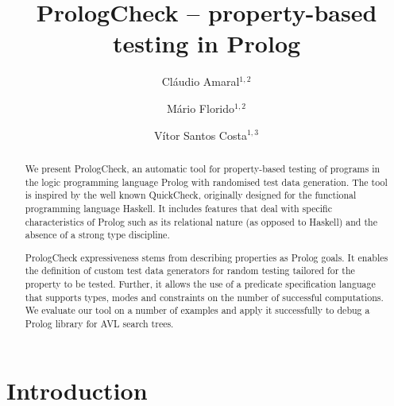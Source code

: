 \documentclass[runningheads,a4paper]{llncs}
\newcommand{\Prolog}[0]{{\sf Prolog}}
\newcommand{\Haskell}[0]{{\sf Haskell}}
\newcommand{\QuickCheck}[0]{{\sf QuickCheck}}
\newcommand{\plqc}[0]{{\sf PrologCheck}}
\begin{document}
\newcommand{\papertitle}{{PrologCheck} -- property-based testing in {Prolog}}

\mainmatter  %

\title{\papertitle}


\author{
  Cl\'audio Amaral$^{1,2}$ \and
  M\'ario Florido$^{1,2}$ \and
  V\'itor Santos Costa$^{1,3}$
}



\maketitle
\begin{abstract}


We present \plqc{}, an automatic tool for property-based
testing of programs in the logic programming language \Prolog{} with
randomised test data generation.
%
The tool is inspired by the well known \QuickCheck, originally designed
for the functional programming language \Haskell{}. It includes features
that deal with specific characteristics of \Prolog{} such as its
relational nature (as opposed to \Haskell{}) and the absence of a strong
type discipline.


\plqc{} expressiveness stems from describing properties as
\Prolog{} goals.
%
It enables the definition of custom test data generators for
random testing tailored for the property to be tested.
%
Further, it allows the use of a predicate specification language that
supports types, modes and constraints on the number of successful
computations.
%
We evaluate our tool on a number of  examples and apply
it successfully to debug a \Prolog{} library for AVL search trees.

\end{abstract}




\section{Introduction}
\label{sec:intro}
\end{document}
